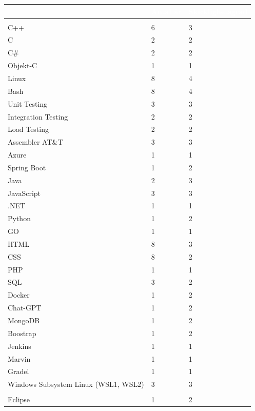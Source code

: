 \documentclass{article}
\begin{document}
\begin{tabular}{|l|l|l|}
\hline
\rowcolor{colorBlue}
\multicolumn{1}{|l|}{\textcolor{white}{\textbf{Kompetens}}} & \multicolumn{1}{l|}{\textcolor{white}{\textbf{Antal år}}} & \multicolumn{1}{l|}{\textcolor{white}{\textbf{Skicklighetsgrad}}} \\
\hline
\rowcolor{colorBlueTwo}
\multicolumn{3}{|l|}{\textcolor{white}{\textbf{Teknisk kunskap}}} \\
\hline
C++ & 6 & 3 \\
\hline
C & 2 & 2 \\
\hline
C\# & 2 & 2 \\
\hline
Objekt-C & 1 & 1 \\
\hline
Linux & 8 & 4 \\
\hline
Bash & 8 & 4 \\
\hline
Unit Testing & 3 & 3 \\
\hline
Integration Testing & 2 & 2 \\
\hline
Load Testing & 2 & 2 \\
\hline
Assembler AT\&T & 3 & 3 \\
\hline
Azure & 1 & 1 \\
\hline
Spring Boot & 1 & 2 \\
\hline
Java & 2 & 3 \\
\hline
JavaScript & 3 & 3 \\
\hline
.NET & 1 & 1 \\
\hline
Python & 1 & 2 \\
\hline
GO & 1 & 1 \\
\hline
HTML & 8 & 3 \\
\hline
CSS & 8 & 2 \\
\hline
PHP & 1 & 1 \\
\hline
SQL & 3 & 2 \\
\hline
Docker & 1 & 2 \\
\hline
Chat-GPT & 1 & 2 \\
\hline
MongoDB & 1 & 2 \\
\hline
Boostrap & 1 & 2 \\
\hline
Jenkins & 1 & 1 \\
\hline
Marvin & 1 & 1 \\
\hline
Gradel & 1 & 1 \\
\hline
Windows Subsystem Linux (WSL1, WSL2) & 3 & 3 \\
\hline
\rowcolor{colorBlueTwo}
\multicolumn{3}{|l|}{\textcolor{white}{\textbf{Applikationskunskap}}} \\
\hline
Eclipse & 1 & 2 \\

\end{tabular}
\end{document}
